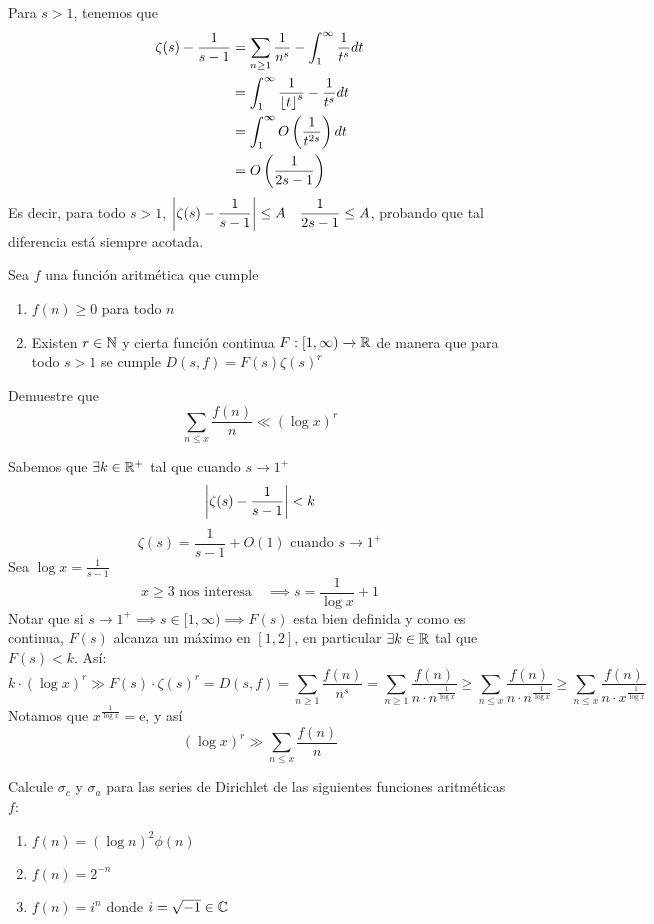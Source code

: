 \begin{sol}
    Para $s>1$, tenemos que
    \begin{align*}
        \zeta(s) - \dfrac{1}{s-1} &= \sum_{n \geq 1} \dfrac{1}{n^s} - \int_1^\infty \dfrac{1}{t^s} dt\\
        &= \int_1^\infty \dfrac{1}{\left\lfloor t\right\rfloor^s} - \dfrac{1}{t^s} dt\\
        &= \int_1^\infty O\left(\dfrac{1}{t^{2s}}\right) dt\\
        &= O\left(\dfrac{1}{2s-1}\right)
    \end{align*}
    Es decir, para todo $s>1$, $\left|\zeta(s) - \dfrac{1}{s-1}\right| \leq A\quad\dfrac{1}{2s-1} \leq A$, probando que tal diferencia está siempre acotada.
\end{sol}
\begin{prob}[2 pts.]
    Sea $f$ una función aritmética que cumple
    \begin{enumerate}[label = (\roman*)]
        \item  $f(n)\geq 0$ para todo $n$

        \item Existen $r\in\mathbb{N}$ y cierta función continua $F:[1,\infty)\xrightarrow[]{}\mathbb{R}$ de manera que para todo $s>1$ se cumple $D(s,f)=F(s)\zeta(s)^r$
    \end{enumerate}
    Demuestre que
    \[\sum_{n\leq x}\frac{f(n)}{n}\ll(\log x)^r\]
\end{prob}

\begin{sol}
    Sabemos que $\exists k\in\mathbb{R}^+$ tal que cuando $s\rightarrow1^+$
    \[\left|\zeta(s)-\frac{1}{s-1}\right|<k\]
    \[ \zeta(s)=\frac{1}{s-1}+O(1)\text{ cuando }s\rightarrow1^+\]
    Sea $\log x=\frac{1}{s-1}$
    \[\text{$x\geq3$ nos interesa}\quad\implies s=\frac{1}{\log x}+1\]
    Notar que si $s\rightarrow1^+\implies s\in[1,\infty)\implies F(s)$ esta bien definida y como es continua, $F(s)$ alcanza un máximo en $[1,2]$, en particular $\exists k\in\mathbb{R}$ tal que $F(s)<k$. Así:
    \[k\cdot(\log x)^r\gg F(s)\cdot\zeta(s)^r=D(s,f)=\sum_{n\geq 1}\frac{f(n)}{n^s}=\sum_{n\geq 1}\frac{f(n)}{n\cdot n^{\frac{1}{\log x}}}\geq\sum_{n \leq x}\frac{f(n)}{n\cdot n^{\frac{1}{\log x}}}\geq\sum_{n \leq x}\frac{f(n)}{n\cdot x^{\frac{1}{\log x}}}\]
    Notamos que $x^\frac{1}{\log x}=\mathrm{e}$, y así
    \[(\log x)^r\gg\sum_{n \leq x}\frac{f(n)}{n}\]
\end{sol}

\begin{prob}[2 pts. c/u]
    Calcule $\sigma_c$ y $\sigma_a$ para las series de Dirichlet de las siguientes funciones aritméticas $f$:
    \begin{enumerate}[label = (\roman*)]
        \item $f(n)=(\log n)^2\phi(n)$

        \item $f(n)=2^{-n}$

        \item $f(n)=i^n$ donde $i=\sqrt{-1}\in\mathbb{C}$
    \end{enumerate}
\end{prob}

